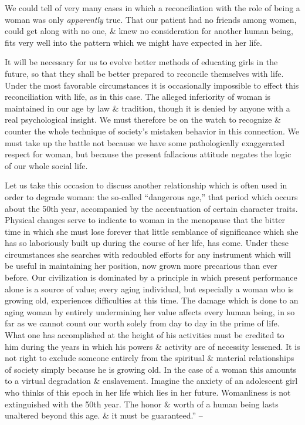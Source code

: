 \documentclass{article}
\begin{document}
We could tell of very many cases in which a reconciliation with the role of being a woman was only {\it apparently} true. That our patient had no friends among women, could get along with no one, \& knew no consideration for another human being, fits very well into the pattern which we might have expected in her life.

It will be necessary for us to evolve better methods of educating girls in the future, so that they shall be better prepared to reconcile themselves with life. Under the most favorable circumstances it is occasionally impossible to effect this reconciliation with life, as in this case. The alleged inferiority of woman is maintained in our age by law \& tradition, though it is denied by anyone with a real psychological insight. We must therefore be on the watch to recognize \& counter the whole technique of society's mistaken behavior in this connection. We must take up the battle not because we have some pathologically exaggerated respect for woman, but because the present fallacious attitude negates the logic of our whole social life.

Let us take this occasion to discuss another relationship which is often used in order to degrade woman: the so-called ``dangerous age,'' that period which occurs about the 50th year, accompanied by the accentuation of certain character traits. Physical changes serve to indicate to woman in the menopause that the bitter time in which she must lose forever that little semblance of significance which she has so laboriously built up during the course of her life, has come. Under these circumstances she searches with redoubled efforts for any instrument which will be useful in maintaining her position, now grown more precarious than ever before. Our civilization is dominated by a principle in which present performance alone is a source of value; every aging individual, but especially a woman who is growing old, experiences difficulties at this time. The damage which is done to an aging woman by entirely undermining her value affects every human being, in so far as we cannot count our worth solely from day to day in the prime of life. What one has accomplished at the height of his activities must be credited to him during the years in which his powers \& activity are of necessity lessened. It is not right to exclude someone entirely from the spiritual \& material relationships of society simply because he is growing old. In the case of a woman this amounts to a virtual degradation \& enslavement. Imagine the anxiety of an adolescent girl who thinks of this epoch in her life which lies in her future. Womanliness is not extinguished with the 50th year. The honor \& worth of a human being lasts unaltered beyond this age. \& it must be guaranteed.'' -- \cite[pp. 133--145]{Adler_human_nature}
\end{document}
